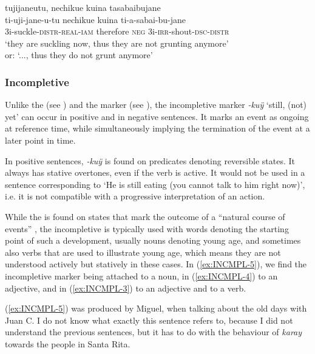 \ea\label{ex:DSCnew-2}
\begingl
\glpreamble tujijaneutu, nechikue kuina tasabaibujane\\
\gla ti-uji-jane-u-tu nechikue kuina ti-a-sabai-bu-jane\\
\glb 3i-suckle-\textsc{distr}-\textsc{real}-\textsc{iam} therefore \textsc{neg} 3i-\textsc{irr}-shout-\textsc{dsc}-\textsc{distr}\\
\glft ‘they are suckling now, thus they are not grunting anymore’\\or: ‘..., thus they do not grunt anymore’
\endgl
\trailingcitation{[rmx-e150922l.155-156]}
\xe
{}


\subsubsection{Incompletive}\label{sec:Incompletive}

Unlike the  (see ) and the  marker (see ), the incompletive marker \textit{-kuÿ} ‘still, (not) yet’ can occur in positive and in negative sentences. It marks an event as ongoing at reference time, while simultaneously implying the termination of the event at a later point in time.

In positive sentences, \textit{-kuÿ} is found on predicates denoting reversible states. It always has stative overtones, even if the verb is active. It would not be used in a sentence corresponding to ‘He is still eating (you cannot talk to him right now)’, i.e. it is not compatible with a progressive interpretation of an action.

While the  is found on states that mark the outcome of a “natural course of events” \citep[30]{Olsson2013}, the incompletive is typically used with words denoting the starting point of such a development, usually nouns denoting young age, and sometimes also verbs that are used to illustrate young age, which means they are not understood actively but statively in these cases. In (\ref{ex:INCMPL-5}), we find the incompletive marker being attached to a noun, in (\ref{ex:INCMPL-4}) to an adjective, and in (\ref{ex:INCMPL-3}) to an adjective and to a verb.

(\ref{ex:INCMPL-5}) was produced by Miguel, when talking about the old days with Juan C. I do not know what exactly this sentence refers to, because I did not understand the previous sentences, but it has to do with the behaviour of \textit{karay} towards the people in Santa Rita.

